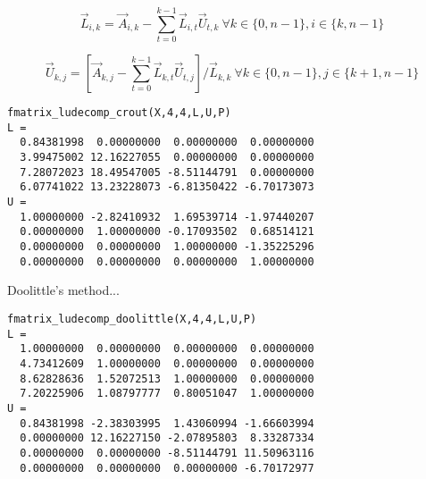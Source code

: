 \[
    \vec{L}_{i,k} = \vec{A}_{i,k} -
                    \sum_{t=0}^{k-1}{ \vec{L}_{i,t} \vec{U}_{t,k} }
                    \ \forall k \in \{0,n-1\}, i \in \{k,n-1\}
\]

\[
    \vec{U}_{k,j} = \left[
                    \vec{A}_{k,j} -
                    \sum_{t=0}^{k-1}{ \vec{L}_{k,t} \vec{U}_{t,j} }
                    \right] / \vec{L}_{k,k}
                    \ \forall k \in \{0,n-1\}, j \in \{k+1,n-1\}
\]

\begin{verbatim}
fmatrix_ludecomp_crout(X,4,4,L,U,P)
L =
  0.84381998  0.00000000  0.00000000  0.00000000
  3.99475002 12.16227055  0.00000000  0.00000000
  7.28072023 18.49547005 -8.51144791  0.00000000
  6.07741022 13.23228073 -6.81350422 -6.70173073
U =
  1.00000000 -2.82410932  1.69539714 -1.97440207
  0.00000000  1.00000000 -0.17093502  0.68514121
  0.00000000  0.00000000  1.00000000 -1.35225296
  0.00000000  0.00000000  0.00000000  1.00000000
\end{verbatim}

Doolittle's method...
\begin{verbatim}
fmatrix_ludecomp_doolittle(X,4,4,L,U,P)
L =
  1.00000000  0.00000000  0.00000000  0.00000000
  4.73412609  1.00000000  0.00000000  0.00000000
  8.62828636  1.52072513  1.00000000  0.00000000
  7.20225906  1.08797777  0.80051047  1.00000000
U =
  0.84381998 -2.38303995  1.43060994 -1.66603994
  0.00000000 12.16227150 -2.07895803  8.33287334
  0.00000000  0.00000000 -8.51144791 11.50963116
  0.00000000  0.00000000  0.00000000 -6.70172977
\end{verbatim}

